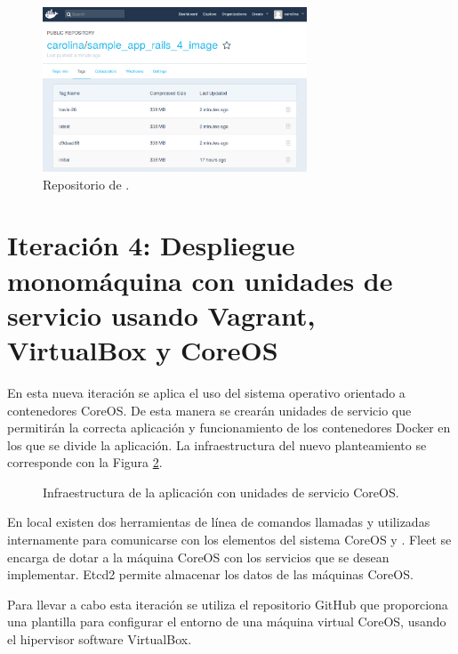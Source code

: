\begin{figure}[H]
\centering
\includegraphics[width=0.7\textwidth]{images/figures/dockerhubimages.png}
\caption{Repositorio de .\label{fig:dockerhub_images}}
\end{figure}

\section[Iteración 4: Despliegue en VirtualBox]{Iteración 4: Despliegue monomáquina con unidades de servicio usando Vagrant, VirtualBox y CoreOS}

En esta nueva iteración se aplica el uso del sistema operativo orientado a contenedores CoreOS. De esta manera se crearán unidades de servicio  que permitirán la correcta aplicación y funcionamiento de los contenedores Docker en los que se divide la aplicación. La infraestructura del nuevo planteamiento se corresponde con la Figura \ref{fig:coreosdiagram}.

\begin{figure}[H] 
\centering
{}
\caption{Infraestructura de la aplicación con unidades de servicio CoreOS.\label{fig:coreosdiagram}}
\end{figure}

En local existen dos herramientas de línea de comandos llamadas  y  utilizadas internamente para comunicarse con los elementos del sistema CoreOS  y . Fleet se encarga de dotar a la máquina CoreOS con los servicios que se desean implementar. Etcd2 permite almacenar los datos de las máquinas CoreOS.

Para llevar a cabo esta iteración se utiliza el repositorio GitHub  que proporciona una plantilla  para configurar el entorno de una máquina virtual CoreOS, usando el hipervisor software VirtualBox.

